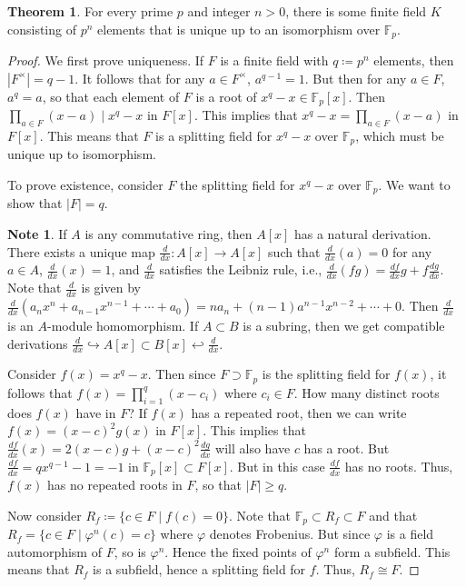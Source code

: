 \documentclass[10pt,letterpaper,cm]{nupset}
\theoremstyle{definition}
\newtheorem{note}[definition]{Note}
\theoremstyle{theorem}
\newtheorem{theorem}[definition]{Theorem}
\theoremstyle{remark}
\newcommand{\F}{\mathbb F}
\newcommand{\1}{\mathbf{1}}
\newcommand{\0}{\vec 0}
\begin{document}
\begin{theorem}
For every prime $p$ and integer $n>0$, there is some finite field $K$ consisting of $p^n$ elements that is unique up to an isomorphism over $\F_p$.
\end{theorem}
\begin{proof}
We first prove uniqueness. If $F$ is a finite field with $q\coloneqq p^n$ elements, then $|F^{\times}| = q-1$. It follows that for any $a \in F^{\times}$,  $a^{q-1} =1$. But then for any $a \in F$, $a^q = a$, so that each element of $F$ is a root of $x^q -x \in \F_p[x]$. Then $\prod_{a\in F}(x-a) \mid x^q -x$ in $F[x]$. This implies that $x^q -x = \prod_{a\in F}(x-a)$ in $F[x]$. This means that $F$ is a splitting field for $x^q-x$ over $\F_p$, which must be unique up to isomorphism.

\medskip

 To prove existence, consider $F$ the splitting field for $x^q -x$ over $\F_p$. We want to show that $|F| =q$. 
\begin{note}
If $A$ is any commutative ring, then $A[x]$ has a natural derivation. There exists a unique map $\frac{d}{dx} : A[x] \to A[x]$ such that $\frac{d}{dx}(a) = 0$ for any $a\in A$, $\frac{d}{dx}(x) =1$, and $\frac{d}{dx}$ satisfies the Leibniz rule, i.e., $\frac{d}{dx}(fg) = \frac{df}{dx}g + f\frac{dg}{dx}$. Note that $\frac{d}{dx}$ is given by $\frac{d}{dx}(a_nx^n  + a_{n-1}x^{n-1} + \cdots + a_0) = na_n + (n-1)a^{n-1}x^{n-2} + \cdots + 0$. Then $\frac{d}{dx}$ is an $A$-module homomorphism. If $A \subset B$ is a subring, then we get compatible derivations $\frac{d}{dx} \hookrightarrow A[x] \subset B[x] \hookleftarrow \frac{d}{dx}$. 
\end{note}

Consider $f(x) = x^q -x$. Then since $F \supset \F_p$ is the splitting field for $f(x)$, it follows that $f(x) = \prod_{i=1}^q (x-c_i)$ where $c_i \in F$. How many distinct roots does $f(x)$ have in $F$? If $f(x)$ has a repeated root, then we can write $f(x) = (x-c)^2g(x)$ in $F[x]$. This implies that $\frac{df}{dx}(x) = 2(x-c)g + (x-c)^2 \frac{dg}{dx}$ will also have $c$ has a root. But $\frac{df}{dx} = qx^{q-1} -1 = {-}1$ in $\F_p[x]\subset F[x]$. But in this case $\frac{df}{dx}$ has no roots. Thus, $f(x)$ has no repeated roots in $F$, so that $|F| \geq q$.

Now consider $R_f\coloneqq  \{c \in F \mid f(c) = 0\}$. Note that $\F_p \subset R_f \subset F$ and that  $R_f = \{c\in F \mid \varphi^n(c) = c\}$ where $\varphi$ denotes Frobenius. But since $\varphi$ is a field automorphism of $F$, so is $\varphi^n$. Hence the fixed points of $\varphi^n$ form a subfield. This means that $R_f$ is a subfield, hence a splitting field for $f$. Thus, $R_f \cong F$. 
\end{proof}
\end{document}
